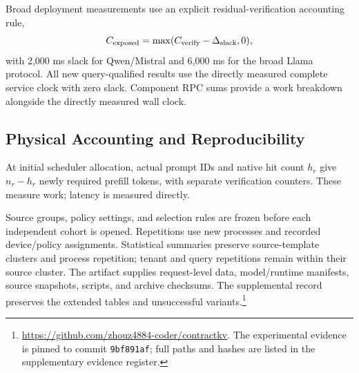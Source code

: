 Broad deployment measurements use an explicit residual-verification accounting rule,
\begin{equation}
 C_{\rm exposed}=\max(C_{\rm verify}-\Delta_{\rm slack},0),
\label{eq:slack}
\end{equation}
with 2,000 ms slack for Qwen/Mistral and 6,000 ms for the broad Llama protocol. All new query-qualified results use the directly measured complete service clock with zero slack. Component RPC sums provide a work breakdown alongside the directly measured wall clock.

\subsection{Physical Accounting and Reproducibility}
At initial scheduler allocation, actual prompt IDs and native hit count $h_r$ give $n_r-h_r$ newly required prefill tokens, with separate verification counters. These measure work; latency is measured directly.

Source groups, policy settings, and selection rules are frozen before each independent cohort is opened. Repetitions use new processes and recorded device/policy assignments. Statistical summaries preserve source-template clusters and process repetition; tenant and query repetitions remain within their source cluster. The artifact supplies request-level data, model/runtime manifests, source snapshots, scripts, and archive checksums. The supplemental record preserves the extended tables and unsuccessful variants.\footnote{\url{https://github.com/zhouz4884-coder/contractkv}. The experimental evidence is pinned to commit \texttt{9bf891af}; full paths and hashes are listed in the supplementary evidence register.}

